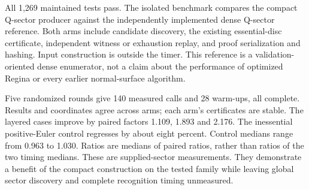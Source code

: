 All 1,269 maintained tests pass. The isolated benchmark compares the compact
Q-sector producer against the independently implemented dense Q-sector
reference. Both arms include candidate discovery, the existing essential-disc
certificate, independent witness or exhaustion replay, and proof serialization
and hashing. Input construction is outside the timer. This reference is a
validation-oriented dense enumerator, not a claim about the performance of
optimized Regina or every earlier normal-surface algorithm.


Five randomized rounds give 140 measured calls and 28 warm-ups, all complete.
Results and coordinates agree across arms; each arm's certificates are stable.
The layered cases improve by paired factors 1.109, 1.893 and 2.176. The
inessential positive-Euler control regresses by about eight percent. Control
medians range from 0.963 to 1.030. Ratios are medians of paired ratios,
rather than ratios of the two timing medians. These are supplied-sector
measurements. They demonstrate a benefit of the compact construction on the
tested family while leaving global sector discovery and complete recognition
timing unmeasured.
